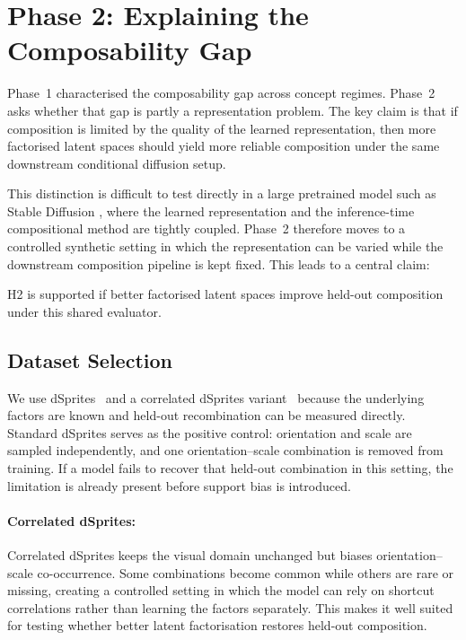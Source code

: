 
\section{Phase 2: Explaining the Composability Gap}
\label{sec:phase_2}

Phase~1 characterised the composability gap across concept regimes. Phase~2 asks whether that gap is partly a representation problem. The key claim is that if composition is limited by the quality of the learned representation, then more factorised latent spaces should yield more reliable composition under the same downstream conditional diffusion setup.

This distinction is difficult to test directly in a large pretrained model such as Stable Diffusion \citep{rombach2022high}, where the learned representation and the inference-time compositional method are tightly coupled. Phase~2 therefore moves to a controlled synthetic setting in which the representation can be varied while the downstream composition pipeline is kept fixed.
This leads to a central claim:
\begin{center}
{\setlength{\fboxsep}{6pt}%
}
\end{center}

H2 is supported if better factorised latent spaces improve held-out composition under this shared evaluator.


\subsection{Dataset Selection}
\label{subsec:p2_testbeds}

We use dSprites~\citep{dsprites17} and a correlated dSprites variant~\citep{roth2023disentanglement} because the underlying factors are known and held-out recombination can be measured directly. Standard dSprites serves as the positive control: orientation and scale are sampled independently, and one orientation--scale combination is removed from training. If a model fails to recover that held-out combination in this setting, the limitation is already present before support bias is introduced.

\paragraph{Correlated dSprites:}
Correlated dSprites keeps the visual domain unchanged but biases orientation--scale co-occurrence. Some combinations become common while others are rare or missing, creating a controlled setting in which the model can rely on shortcut correlations rather than learning the factors separately. This makes it well suited for testing whether better latent factorisation restores held-out composition.

